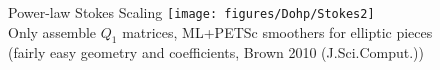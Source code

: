 \begin{frame}{Power-law Stokes Scaling}
  \centering
  \texttt{[image: figures/Dohp/Stokes2]} \\
  {\small Only assemble $Q_1$ matrices, ML+PETSc smoothers for elliptic pieces \\
  (fairly easy geometry and coefficients, Brown 2010 (J.Sci.Comput.))}
\end{frame}
